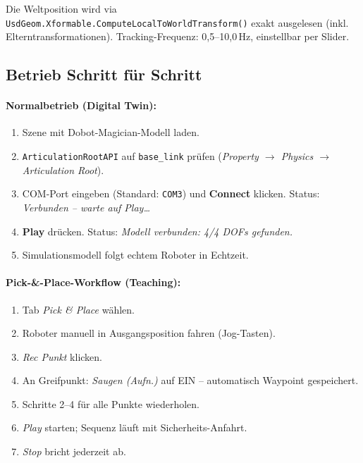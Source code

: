 \documentclass[11pt,a4paper]{article}
\begin{document}
Die Weltposition wird via
\texttt{UsdGeom.Xformable.ComputeLocalToWorldTransform()} exakt
ausgelesen (inkl. Elterntransformationen).
Tracking-Frequenz: 0,5--10,0\,Hz, einstellbar per Slider.

\subsection{Betrieb Schritt für Schritt}
\label{sec:betrieb}

\paragraph{Normalbetrieb (Digital Twin):}

\begin{enumerate}
  \item Szene mit Dobot-Magician-Modell laden.
  \item \texttt{ArticulationRootAPI} auf \texttt{base\_link}
        prüfen (\textit{Property $\to$ Physics $\to$ Articulation Root}).
  \item COM-Port eingeben (Standard: \texttt{COM3}) und
        \textbf{Connect} klicken.
        Status: \textit{Verbunden -- warte auf Play\ldots}
  \item \textbf{Play} drücken.
        Status: \textit{Modell verbunden: 4/4 DOFs gefunden.}
  \item Simulationsmodell folgt echtem Roboter in Echtzeit.
\end{enumerate}

\paragraph{Pick-\&-Place-Workflow (Teaching):}

\begin{enumerate}
  \item Tab \textit{Pick \& Place} wählen.
  \item Roboter manuell in Ausgangsposition fahren (Jog-Tasten).
  \item \textit{Rec Punkt} klicken.
  \item An Greifpunkt: \textit{Saugen (Aufn.)} auf EIN --
        automatisch Waypoint gespeichert.
  \item Schritte 2--4 für alle Punkte wiederholen.
  \item \textit{Play} starten; Sequenz läuft mit Sicherheits-Anfahrt.
  \item \textit{Stop} bricht jederzeit ab.
\end{enumerate}
\end{document}
